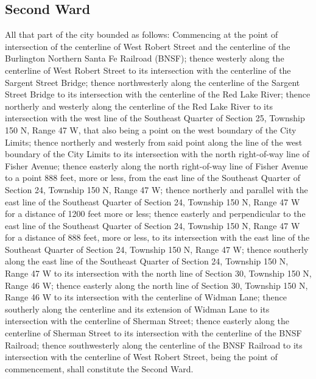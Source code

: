 \subsection{Second Ward}
All that part of the city bounded as follows:  Commencing at the point of intersection of the centerline of West Robert Street and the centerline of the Burlington Northern Santa Fe Railroad (BNSF); thence westerly along the centerline of West Robert Street to its intersection with the centerline of the Sargent Street Bridge; thence northwesterly along the centerline of the Sargent Street Bridge to its intersection with the centerline of the Red Lake River; thence northerly and westerly along the centerline of the Red Lake River to its intersection with the west line of the Southeast Quarter of Section 25, Township 150 N, Range 47 W, that also being a point on the west boundary of the City Limits; thence northerly and westerly from said point along the line of the west boundary of the City Limits to its intersection with the north right-of-way line of Fisher Avenue; thence easterly along the north right-of-way line of Fisher Avenue to a point 888 feet, more or less, from the east line of the Southeast Quarter of Section 24, Township 150 N, Range 47 W; thence northerly and parallel with the east line of the Southeast Quarter of Section 24, Township 150 N, Range 47 W for a distance of 1200 feet more or less; thence easterly and perpendicular to the east line of the Southeast Quarter of Section 24, Township 150 N, Range 47 W for a distance of 888 feet, more or less, to its intersection with the east line of the Southeast Quarter of Section 24, Township 150 N, Range 47 W; thence southerly along the east line of the Southeast Quarter of Section 24, Township 150 N, Range 47 W to its intersection with the north line of Section 30, Township 150 N, Range 46 W; thence easterly along the north line of Section 30, Township 150 N, Range 46 W to its intersection with the centerline of Widman Lane; thence southerly along the centerline and its extension of Widman Lane to its intersection with the centerline of Sherman Street; thence easterly along the centerline of Sherman Street to its intersection with the centerline of the BNSF Railroad; thence southwesterly along the centerline of the BNSF Railroad to its intersection with the centerline of West Robert Street, being the point of commencement, shall constitute the Second Ward.


